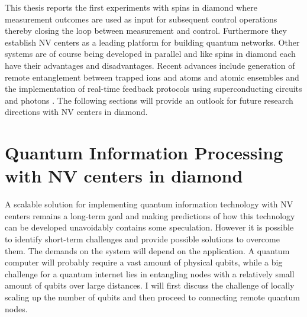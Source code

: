 This thesis reports the first experiments with spins in diamond where measurement outcomes are used as input for subsequent control operations thereby closing the loop between measurement and control. Furthermore they establish NV centers as a leading platform for building quantum networks.  Other systems are of course being developed in parallel and like spins in diamond each have their advantages and disadvantages. Recent advances include generation of remote entanglement between trapped ions \cite{Moehring_Nature_2007} and atoms\cite{Hofmann_Science_2012,Ritter_Nature_2012} and atomic ensembles\cite{Chou_Nature_2005} and the implementation of real-time feedback protocols using superconducting circuits\cite{Vijay_Nature_2012,Riste_Nature_2013} and photons \cite{Gillett_Phys.Rev.Lett._2010,Sayrin_Nature_2011}. The following sections will provide an outlook for future research directions with NV centers in diamond.

\section{Quantum Information Processing with NV centers in diamond}
A scalable solution for implementing quantum information technology with NV centers remains a long-term goal and making predictions of how this technology can be developed unavoidably contains some speculation. However it is possible to identify short-term challenges and provide possible solutions to overcome them. The demands on the system will depend on the application. A quantum computer will probably require a vast amount of physical qubits, while a big challenge for a quantum internet lies in entangling nodes with a relatively small amount of qubits over large distances. I will first discuss the challenge of locally scaling up the number of qubits and then proceed to connecting remote quantum nodes.

